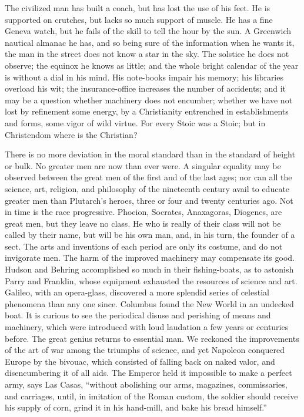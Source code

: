\documentclass[12pt]{article}
\begin{document}
The civilized man has built a coach, but has lost the use of his feet. He is
supported on crutches, but lacks so much support of muscle. He has a fine
Geneva watch, but he fails of the skill to tell the hour by the sun. A
Greenwich nautical almanac he has, and so being sure of the information when
he wants it, the man in the street does not know a star in the sky. The
solstice he does not observe; the equinox he knows as little; and the whole
bright calendar of the year is without a dial in his mind. His note-books
impair his memory; his libraries overload his wit; the insurance-office
increases the number of accidents; and it may be a question whether
machinery does not encumber; whether we have not lost by refinement some
energy, by a Christianity entrenched in establishments and forms, some vigor
of wild virtue. For every Stoic was a Stoic; but in Christendom where is the
Christian?

There is no more deviation in the moral standard than in the standard of
height or bulk. No greater men are now than ever were. A singular equality
may be observed between the great men of the first and of the last ages; nor
can all the science, art, religion, and philosophy of the nineteenth century
avail to educate greater men than Plutarch's heroes, three or four and
twenty centuries ago. Not in time is the race progressive. Phocion,
Socrates, Anaxagoras, Diogenes, are great men, but they leave no class. He
who is really of their class will not be called by their name, but will be
his own man, and, in his turn, the founder of a sect. The arts and
inventions of each period are only its costume, and do not invigorate men.
The harm of the improved machinery may compensate its good. Hudson and
Behring accomplished so much in their fishing-boats, as to astonish Parry
and Franklin, whose equipment exhausted the resources of science and art.
Galileo, with an opera-glass, discovered a more splendid series of celestial
phenomena than any one since. Columbus found the New World in an undecked
boat. It is curious to see the periodical disuse and perishing of means and
machinery, which were introduced with loud laudation a few years or
centuries before. The great genius returns to essential man. We reckoned the
improvements of the art of war among the triumphs of science, and yet
Napoleon conquered Europe by the bivouac, which consisted of falling back on
naked valor, and disencumbering it of all aids. The Emperor held it
impossible to make a perfect army, says Las Casas, ``without abolishing our
arms, magazines, commissaries, and carriages, until, in imitation of the
Roman custom, the soldier should receive his supply of corn, grind it in his
hand-mill, and bake his bread himself.''
\end{document}
